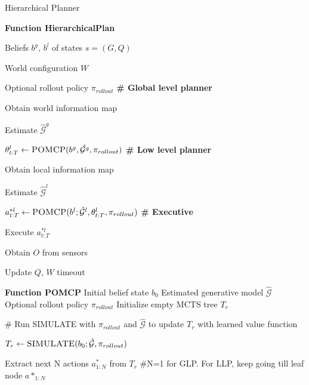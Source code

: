 
\begin{algorithm}[t!]
\caption{Hierarchical Planner}
\label{alg:hierarchicalPlanner}
\begin{multicols}{2}
\begin{algorithmic}
\STATE \textbf{Function HierarchicalPlan}
\item Beliefs $b^g$, $b^l$ of states $s=(G, Q)$
\item World configuration $W$
\item Optional rollout policy $\pi_{rollout}$
\REPEAT
    \STATE \textbf{\# Global level planner}
    \item  Obtain world information map
    \item Estimate $\hat{\mathcal{G}}^g$
    \item $\theta^l_{t:T} \gets \textsc{POMCP}(b^g, \hat{\mathcal{G}^g}, \pi_{rollout})$
    \STATE \textbf{\# Low level planner}
    \item Obtain local information map
    \item Estimate $\hat{\mathcal{G}}^l$
    \item $a_{t:T}^{*l} \gets \textsc{POMCP}(b^l;\hat{\mathcal{G}}^l, \theta^l_{t:T}, \pi_{rollout})$ 
    \STATE \textbf{\# Executive}
    \item Execute $a_{t:T}^{*l}$
    \item Obtain $O$ from sensors
    \item Update $Q$, $W$
\UNTIL timeout
\end{algorithmic}

\begin{algorithmic}
\STATE \textbf{Function POMCP}
\REQUIRE Initial belief state $b_0$
\REQUIRE Estimated generative model $\hat{\mathcal{G}}$
\STATE Optional rollout policy $\pi_{rollout}$
\STATE
\STATE Initialize empty MCTS tree $T_r$
\REPEAT
    \item \# Run SIMULATE with $\pi_{rollout}$ and $\hat{\mathcal{G}}$ to update $T_r$ with learned value function
    \item $T_r \gets \textsc{SIMULATE}(b_0; \hat{\mathcal{G}}, \pi_{rollout})$
\item 
\item Extract next N actions $a^*_{1:N}$ from $T_r$ \#N=1 for GLP. For LLP, keep going till leaf node
\STATE
\RETURN $a*_{1:N}$
\STATE {}


\end{algorithmic}
\end{multicols}
\end{algorithm}
